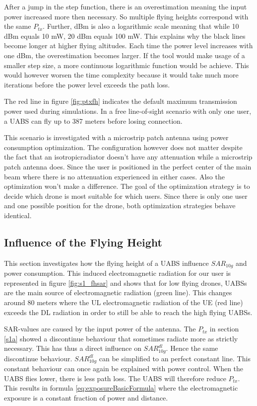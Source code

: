 After a jump in the step function, there is an overestimation meaning the input power increased more then necessary. So multiple flying heights correspond with the same $P_{tx}$.
Further, dBm is also a logarithmic scale meaning that while 10 dBm equals 10 mW, 20 dBm equals 100 mW. This explains why the black lines become longer at higher flying altitudes.
Each time the power level increases with one dBm, the overestimation becomes larger. If the tool would make usage of a smaller step size, a more continuous 
logarithmic function would be achieve. This would however worsen the time complexity because it would take much more iterations before 
the power level exceeds the path loss. 

The red line in figure \ref{fig:ptxfh} indicates the default maximum transmission power used during simulations. 
In a free line-of-sight scenario with only one user, a \gls{UABS} can fly up to 387 meters before losing connection.

This scenario is investigated with a microstrip patch antenna using power consumption optimization. The configuration however does not matter
despite the fact that an \gls{isotropicradiator} doesn't have any attenuation while a microstrip patch antenna does.
Since the user is positioned in the perfect center of the main beam where there is 
no attenuation experienced in either cases. Also the optimization won't make a difference. The goal of the optimization strategy is to decide which 
drone is most suitable for which users. Since there is only one user and one possible position for the drone, both optimization strategies behave identical.

\FloatBarrier
\subsection{Influence of the Flying Height}
\label{sub:senario1_influenceOfFlyHeight}

This section investigates how the flying height of a \gls{UABS} influence $SAR_{10g}$ and power consumption.
This induced electromagnetic radiation for our user is represented in figure \ref{fig:s1_fhsar}
and shows that for low flying drones, \gls{UABS}s are the main source of electromagnetic radiation (green line).
This changes around 80 meters where the \gls{UL} electromagnetic radiation of the \gls{UE} (red line)
exceeds the \gls{DL} radiation in order to still be able to reach the high flying \gls{UABS}s.

\gls{SAR}-values are caused by the input power of the antenna. The $P_{tx}$ in section \ref{s1a}
showed a discontinue behaviour that sometimes radiate more as strictly necessary. This has thus a direct influence
on  $SAR^{dl}_{10g}$. Hence the same discontinue behaviour. $SAR^{dl}_{10g}$ can be simplified to an perfect constant line.
This constant behaviour can once again be explained with power control. When the \gls{UABS} flies lower, there is  less path loss. The \gls{UABS} 
will therefore reduce $P_{tx}$. This results in formula \ref{eq:exposureBasicFormula} where the electromagnetic exposure is a constant fraction of power and distance.

